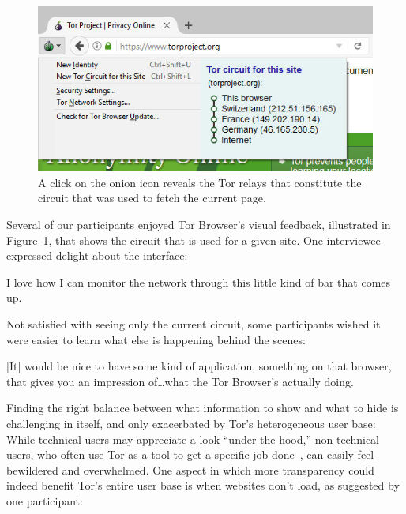 \begin{figure}[t]
    \centering
    \includegraphics[width=\linewidth]{figures/tor-button-screenshot.jpg}
    \caption{A click on the onion icon reveals the Tor relays that constitute
    the circuit that was used to fetch the current page.}
    \label{fig:tor-button}
\end{figure}

Several of our participants enjoyed Tor Browser's visual feedback, illustrated
in Figure~\ref{fig:tor-button}, that shows the circuit that is used for a given
site.  One interviewee expressed delight about the interface:

\begin{displayquote}
I love how I can monitor the network through this little kind of bar that comes
up.
\end{displayquote}

Not satisfied with seeing only the current circuit, some participants wished it
were easier to learn what else is happening behind the scenes:

\begin{displayquote}
{[It]} would be nice to have some kind of application, something on that browser,
that gives you an impression of\dots what the Tor Browser's actually doing.
\end{displayquote}

Finding the right balance between what information to show and what to hide is
challenging in itself, and only exacerbated by Tor's heterogeneous user base:
While technical users may appreciate a look ``under the hood,'' non-technical
users, who often use Tor as a tool to get a specific job
done~\cite[\S~4.3.2]{Gallagher2017a}, can easily feel bewildered and
overwhelmed.  One aspect in which more transparency could indeed benefit Tor's
entire user base is when websites don't load, as suggested by one participant:


